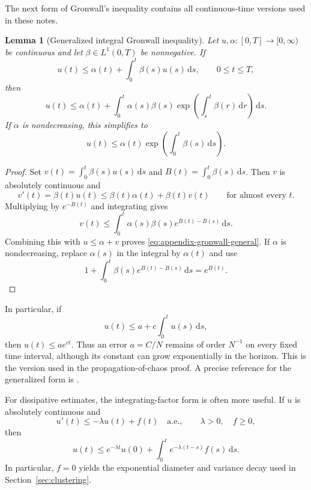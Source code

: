 \documentclass[11pt]{amsart}
\numberwithin{equation}{section}
\theoremstyle{plain}
\newtheorem{lemma}[theorem]{Lemma}
\newcommand{\dd}{\,\mathrm{d}}
\begin{document}
The next form of Gronwall's inequality contains all continuous-time versions
used in these notes.

\begin{lemma}[Generalized integral Gronwall inequality]
\label{lem:appendix-gronwall}
Let $u,\alpha:[0,T]\to[0,\infty)$ be continuous and let
$\beta\in L^1(0,T)$ be nonnegative.  If
\begin{equation}\label{eq:appendix-gronwall-assumption}
 u(t)\leq\alpha(t)+\int_0^t\beta(s)u(s)\dd s,
 \qquad 0\leq t\leq T,
\end{equation}
then
\begin{equation}\label{eq:appendix-gronwall-general}
 u(t)\leq\alpha(t)+\int_0^t\alpha(s)\beta(s)
 \exp\left(\int_s^t\beta(r)\dd r\right)\dd s.
\end{equation}
If $\alpha$ is nondecreasing, this simplifies to
\begin{equation}\label{eq:appendix-gronwall-monotone}
 u(t)\leq\alpha(t)
 \exp\left(\int_0^t\beta(s)\dd s\right).
\end{equation}
\end{lemma}
\begin{proof}
Set
$v(t)=\int_0^t\beta(s)u(s)\dd s$ and
$B(t)=\int_0^t\beta(s)\dd s$.  Then $v$ is absolutely continuous and
\[
 v'(t)=\beta(t)u(t)
 \leq\beta(t)\alpha(t)+\beta(t)v(t)
 \qquad\text{for almost every }t.
\]
Multiplying by $e^{-B(t)}$ and integrating gives
\[
 v(t)\leq\int_0^t\alpha(s)\beta(s)e^{B(t)-B(s)}\dd s.
\]
Combining this with $u\leq\alpha+v$ proves
\eqref{eq:appendix-gronwall-general}.  If $\alpha$ is nondecreasing, replace
$\alpha(s)$ in the integral by $\alpha(t)$ and use
\[
 1+\int_0^t\beta(s)e^{B(t)-B(s)}\dd s=e^{B(t)}.
\]
\end{proof}

In particular, if
\begin{equation}\label{eq:appendix-course-gronwall}
 u(t)\leq a+c\int_0^tu(s)\dd s,
\end{equation}
then $u(t)\leq ae^{ct}$.  Thus an error $a=C/N$ remains of order $N^{-1}$
on every fixed time interval, although its constant can grow exponentially in
the horizon.  This is the version used in the propagation-of-chaos proof.  A
precise reference for the generalized form is
\cite[Lemma~2.7]{Teschl2012}.

For dissipative estimates, the integrating-factor form is often more useful.
If $u$ is absolutely continuous and
\[
 u'(t)\leq-\lambda u(t)+f(t)
 \quad\text{a.e.},\qquad \lambda>0,\quad f\geq0,
\]
then
\begin{equation}\label{eq:appendix-dissipative-gronwall}
 u(t)\leq e^{-\lambda t}u(0)
 +\int_0^te^{-\lambda(t-s)}f(s)\dd s.
\end{equation}
In particular, $f=0$ yields the exponential diameter and variance decay used
in Section~\ref{sec:clustering}.
\end{document}
